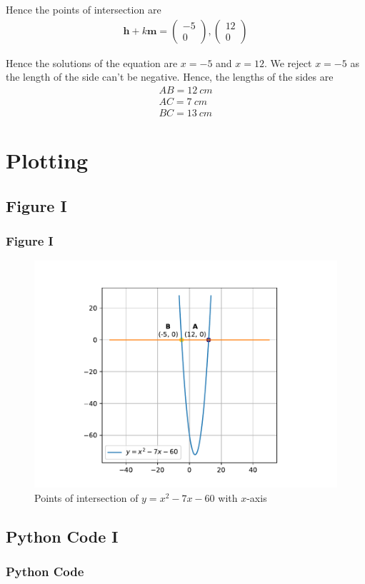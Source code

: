 \documentclass{beamer}
\let\vec\mathbf
\newcommand{\myvec}[1]{\ensuremath{\begin{pmatrix}#1\end{pmatrix}}}
\begin{document}
\begin{frame} 
    Hence the points of intersection are
    \begin{align}
        \vec{h} + k\vec{m} = \myvec{-5 \\ 0}, \myvec{12 \\ 0}
    \end{align}

    Hence the solutions of the equation are $x = -5$ and $x = 12$. We reject $x = -5$ as the length of the side
    can't be negative. Hence, the lengths of the sides are
    \begin{align}
        AB = 12\ cm \\
        AC = 7\ cm \\
        BC = 13\ cm
    \end{align}
\end{frame}

\section{Plotting}
\subsection{Figure I}
\begin{frame}
    \frametitle{Figure I}
    \begin{figure}[h!]
        \includegraphics[width=0.9\linewidth]{figs/parabola.pdf}
        \caption{Points of intersection of $y = x^2 - 7x - 60$ with $x$-axis}
    \end{figure}
\end{frame}

\subsection{Python Code I}
\begin{frame}[allowframebreaks]
    \frametitle{Python Code}
    
\end{frame}
\end{document}
